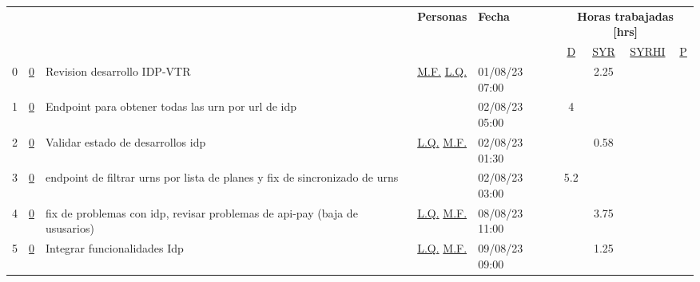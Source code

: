 \documentclass{article}
\begin{document}
\begin{longtable}{|m{0.5cm}|m{1.2cm}|p{5cm}|m{1.5cm}|m{1.5cm}||c|c|c|c||}
        \hline
        \multirow{2}{=}{\centering{\textbf{N°}}} & \multirow{2}{=}{\centering{\textbf{N°Hist}}} & \multirow{2}{=}{\centering{\textbf{Detalle Tarea}}}  & \multirow{2}{=}{\textbf{Personas}} & \multirow{2}{=}{\textbf{Fecha}} &   
        \multicolumn{4}{c|}{
            \textbf{Horas trabajadas [hrs]}
        } \\ 
        \hhline{~~~~~----}
        &&&&&  \hyperref[D]{\color{blue}D}  
&  \hyperref[SYR]{\color{blue}SYR}  
&  \hyperref[SYRHI]{\color{blue}SYRHI}  
&  \hyperref[P]{\color{blue}P}  
\\ \hline \hline
                 \label{0}0  &  \hyperref[0]{\color{blue}0}  & Revision desarrollo IDP-VTR &  
                  \hyperref[M.F.]{\color{blue}M.F.} \newline  \hyperref[L.Q.]{\color{blue}L.Q.}  & 01/08/23 07:00  &  & 2.25 &  & \\ \hline 

                 \label{1}1  &  \hyperref[0]{\color{blue}0}  & Endpoint para obtener todas las urn por url de idp &  
                 & 02/08/23 05:00  & 4 &  &  & \\ \hline 

                 \label{2}2  &  \hyperref[0]{\color{blue}0}  & Validar estado de desarrollos idp &  
                  \hyperref[L.Q.]{\color{blue}L.Q.} \newline  \hyperref[M.F.]{\color{blue}M.F.}  & 02/08/23 01:30  &  & 0.58 &  & \\ \hline 

                 \label{3}3  &  \hyperref[0]{\color{blue}0}  & endpoint de filtrar urns por lista de planes y fix de sincronizado de urns &  
                 & 02/08/23 03:00  & 5.2 &  &  & \\ \hline 

                 \label{4}4  &  \hyperref[0]{\color{blue}0}  & fix de problemas con idp, revisar problemas de api-pay (baja de ususarios) &  
                  \hyperref[L.Q.]{\color{blue}L.Q.} \newline  \hyperref[M.F.]{\color{blue}M.F.}  & 08/08/23 11:00  &  & 3.75 &  & \\ \hline 

                 \label{5}5  &  \hyperref[0]{\color{blue}0}  & Integrar funcionalidades Idp &  
                  \hyperref[L.Q.]{\color{blue}L.Q.} \newline  \hyperref[M.F.]{\color{blue}M.F.}  & 09/08/23 09:00  &  & 1.25 &  & \\ \hline 


\end{longtable}
\end{document}
